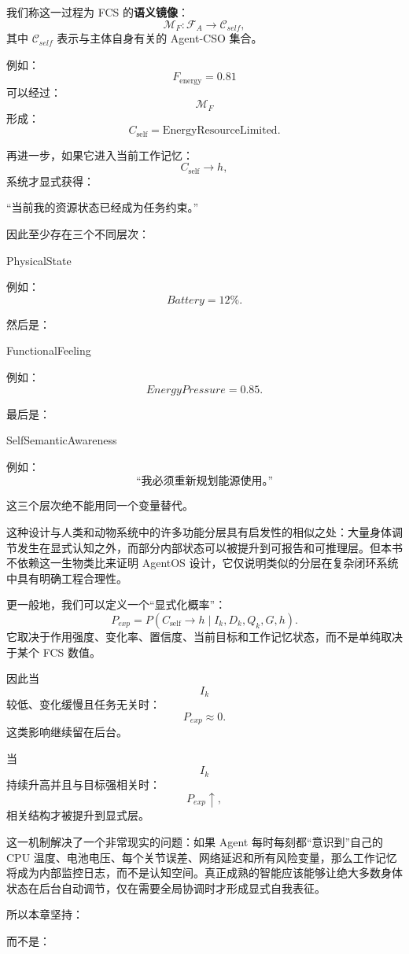 我们称这一过程为 FCS 的\textbf{语义镜像}：
\[
\mathcal M_F:
\mathcal F_A
\rightarrow
\mathcal C_{self},
\]
其中 $\mathcal C_{self}$ 表示与主体自身有关的 Agent-CSO 集合。

例如：
\[
F_{\mathrm{energy}}=0.81
\]
可以经过：
\[
\mathcal M_F
\]
形成：
\[
C_{\mathrm{self}}
=
\text{EnergyResourceLimited}.
\]

再进一步，如果它进入当前工作记忆：
\[
C_{\mathrm{self}}\rightarrow h,
\]
系统才显式获得：
\begin{statementbox}
``当前我的资源状态已经成为任务约束。''
\end{statementbox}

因此至少存在三个不同层次：

\begin{statementbox}
PhysicalState
\end{statementbox}
例如：
\[
Battery=12\%.
\]

然后是：
\begin{statementbox}
FunctionalFeeling
\end{statementbox}
例如：
\[
EnergyPressure=0.85.
\]

最后是：
\begin{statementbox}
SelfSemanticAwareness
\end{statementbox}
例如：
\[
\text{``我必须重新规划能源使用。''}
\]

这三个层次绝不能用同一个变量替代。

这种设计与人类和动物系统中的许多功能分层具有启发性的相似之处：大量身体调节发生在显式认知之外，而部分内部状态可以被提升到可报告和可推理层。但本书不依赖这一生物类比来证明 AgentOS 设计，它仅说明类似的分层在复杂闭环系统中具有明确工程合理性。

更一般地，我们可以定义一个“显式化概率”：
\[
P_{exp}
=
P
\left(
C_{\mathrm{self}}\rightarrow h
\mid
I_k,D_k,Q_k,G,h
\right).
\]
它取决于作用强度、变化率、置信度、当前目标和工作记忆状态，而不是单纯取决于某个 FCS 数值。

因此当
\[
I_k
\]
较低、变化缓慢且任务无关时：
\[
P_{exp}\approx 0.
\]
这类影响继续留在后台。

当
\[
I_k
\]
持续升高并且与目标强相关时：
\[
P_{exp}\uparrow,
\]
相关结构才被提升到显式层。

这一机制解决了一个非常现实的问题：如果 Agent 每时每刻都“意识到”自己的 CPU 温度、电池电压、每个关节误差、网络延迟和所有风险变量，那么工作记忆将成为内部监控日志，而不是认知空间。真正成熟的智能应该能够让绝大多数身体状态在后台自动调节，仅在需要全局协调时才形成显式自我表征。

所以本章坚持：
\begin{statementbox}
\centering
{}
\end{statementbox}
而不是：
\begin{statementbox}
\centering
{}
\end{statementbox}

